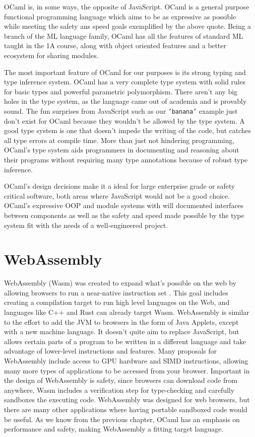 \documentclass[12pt,a4paper,twoside,openright]{report}
\begin{document}
OCaml is, in some ways, the opposite of JavaScript.
OCaml is a general purpose functional programming language which aims to be as expressive as possible while meeting the safety ans speed goals exemplified by the above quote.
Being a branch of the ML language family, OCaml has all the features of standard ML taught in the 1A course, along with object oriented features and a better ecosystem for sharing modules.

The most important feature of OCaml for our purposes is its strong typing and type inference system.
OCaml has a very complete type system with solid rules for basic types and powerful parametric polymorphism.
There aren't any big holes in the type system, as the language came out of academia and is provably sound.
The fun surprises from JavaScript such as our {\tt 'banana'} example just don't exist for OCaml because they wouldn't be allowed by the type system.
A good type system is one that doesn't impede the writing of the code, but catches all type errors at compile time.
More than just not hindering programming, OCaml's type system aids programmers in documenting and reasoning about their programs without requiring many type annotations because of robust type inference.

OCaml's design decisions make it a ideal for large enterprise grade or safety critical software, both areas where JavaScript would not be a good choice.
OCaml's expressive OOP and module systems with will documented interfaces between components as well as the safety and speed made possible by the type system fit with the needs of a well-engineered project.

\section{WebAssembly}

WebAssembly (Wasm) was created to expand what's possible on the web by allowing browsers to run a near-native instruction set \cite{wasmorg}.
This goal includes creating a compilation target to run high level languages on the Web, and languages like C++ and Rust can already target Wasm.
WebAssembly is similar to the effort to add the JVM to browsers in the form of Java Applets, except with a new machine language.
It doesn't quite aim to replace JavaScript, but allows certain parts of a program to be written in a different language and take advantage of lower-level instructions and features.
Many proposals for WebAssembly include access to GPU hardware and SIMD instructions, allowing many more types of applications to be accessed from your browser.
Important in the design of WebAssembly is safety, since browsers can download code from anywhere, Wasm includes a verification step for type-checking and carefully sandboxes the executing code.
WebAssembly was designed for web browsers, but there are many other applications where having portable sandboxed code would be useful.
As we know from the previous chapter, OCaml has an emphasis on performance and safety, making WebAssembly a fitting target language.
\end{document}
